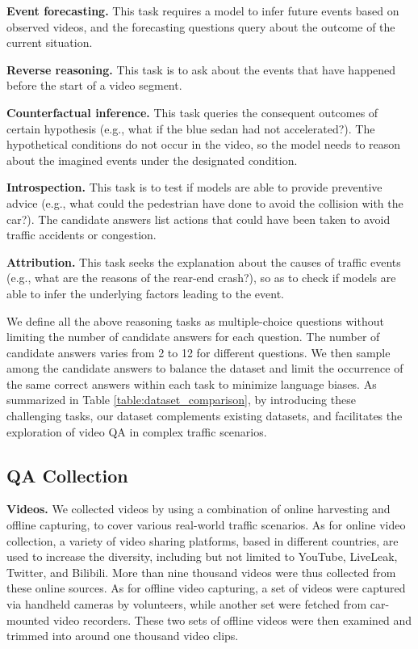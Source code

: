 \documentclass[final]{cvpr}
\begin{document}
{\bf Event forecasting.} This task requires a model to infer future events based on observed videos, and the forecasting questions query about the outcome of the current situation. 

{\bf Reverse reasoning.} This task is to ask about the events that have happened before the start of a video segment.


{\bf Counterfactual inference.} This task queries the consequent outcomes of certain hypothesis (e.g., what if the blue sedan had not accelerated?). The hypothetical conditions do not occur in the video, so the model needs to reason about the imagined events under the designated condition.

{\bf Introspection.} This task is to test if models are able to provide preventive advice (e.g., what could the pedestrian have done to avoid the collision with the car?). 
The candidate answers list actions that could have been taken to avoid traffic accidents or congestion.

{\bf Attribution.} This task seeks the explanation about the causes of traffic events (e.g., what are the reasons of the rear-end crash?), so as to check if models are able to infer the underlying factors leading to the event. 

We define all the above reasoning tasks as multiple-choice questions without limiting the number of candidate answers for each question. The number of candidate answers varies from 2 to 12 for different questions. We then sample among the candidate answers to balance the dataset and limit the occurrence of the same correct answers within each task to minimize language biases. As summarized in Table \ref{table:dataset_comparison}, by introducing these challenging tasks, our dataset complements existing datasets, and facilitates the exploration of video QA in complex traffic scenarios.

\subsection{QA Collection}

{\bf Videos.} We collected videos by using a combination of online harvesting and offline capturing, to cover various real-world traffic scenarios.
As for online video collection, a variety of video sharing platforms, based in different countries, are used to increase the diversity, including but not limited to YouTube, LiveLeak, Twitter, and Bilibili. More than nine thousand videos were thus collected from these online sources.
As for offline video capturing, a set of videos were captured via handheld cameras by volunteers, while another set were fetched from car-mounted video recorders. These two sets of offline videos were then examined and trimmed into around one thousand video clips.
\end{document}
